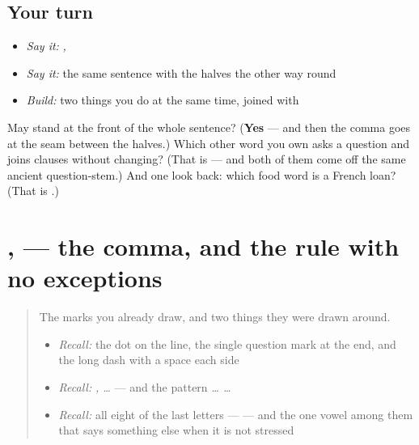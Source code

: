 \subsection*{Your turn}
\begin{itemize}
\raggedright
  \item \emph{Say it:} \emph{  ,  }
  \item \emph{Say it:} the same sentence with the halves the other way round
  \item \emph{Build:} two things you do at the same time, joined with \textbf{}
\end{itemize}

\begin{tcolorbox}[breakable,colback=teal!4,colframe=teal!35!black,title={Before you move on}]
May \textbf{} stand at the front of the whole sentence? (\textbf{Yes} — and then the comma goes at the seam between the halves.) Which other word you own asks a question and joins clauses without changing? (That is \textbf{} — and both of them come off the same ancient question-stem.) And one look back: which food word is a French loan? (That is \textbf{}.)
\end{tcolorbox}
\section[, (zapyatáya)]{, — the comma, and the rule with no exceptions}

\label{lesson:RU-W10-zapyataya}



\begin{quote}
The marks you already draw, and two things they were drawn around.

\begin{itemize}
\raggedright
  \item \emph{Recall:} the dot on the line, the single question mark at the end, and the long dash with a space each side
  \item \emph{Recall:} \emph{  ,  …} — and the pattern \emph{ …  …}
  \item \emph{Recall:} all eight of the last letters — \textbf{       } — and the one vowel among them that says something else when it is not stressed
\end{itemize}
\end{quote}

